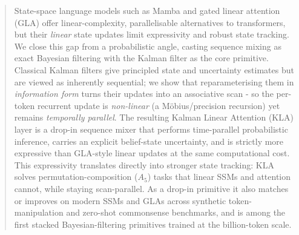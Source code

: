 \documentclass{article}
\begin{document}



\printAffiliationsAndNotice{}



\begin{abstract}
State-space language models such as Mamba and gated linear attention (GLA) offer linear-complexity, parallelisable alternatives to transformers, but their \emph{linear} state updates limit expressivity and robust state tracking. We close this gap from a probabilistic angle, casting sequence mixing as exact Bayesian filtering with the Kalman filter as the core primitive. Classical Kalman filters give principled state and uncertainty estimates but are viewed as inherently sequential; we show that reparameterising them in \emph{information form} turns their updates into an associative scan - so the per-token recurrent update is \emph{non-linear} (a M\"obius/precision recursion) yet remains \emph{temporally parallel}. The resulting Kalman Linear Attention (KLA) layer is a drop-in sequence mixer that performs time-parallel probabilistic inference, carries an explicit belief-state uncertainty, and is strictly more expressive than GLA-style linear updates at the same computational cost. This expressivity translates directly into stronger state tracking: KLA solves permutation-composition ($A_5$) tasks that linear SSMs and attention cannot, while staying scan-parallel. As a drop-in primitive it also matches or improves on modern SSMs and GLAs across synthetic token-manipulation and zero-shot commonsense benchmarks, and is among the first stacked Bayesian-filtering primitives trained at the billion-token scale.
\end{abstract}
\end{document}
